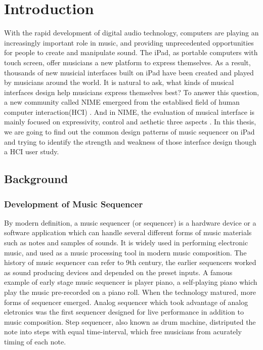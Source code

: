\pagestyle{fancy}
\rhead{\thepage}
\chapter{Introduction}

With the rapid development of digital audio technology, computers are playing an increasingly important role in music, and providing unprecedented opportunities for people to create and manipulate sound. The iPad, as portable computers with touch screen, offer musicians a new platform to express themselves. As a result, thousands of new musicial interfaces built on iPad have been created and played by musicians around the world. It is natural to ask, what kinds of musical interfaces design help musicians express themselves best? To answer this question, a new community called NIME emergeed from the establised field of human computer interaction(HCI) \citep{Reference16}. And in NIME, the evaluation of musical interface is mainly focused on expressivity, control and aethetic three aspects \citep{Reference0}. In this thesis, we are going to find out the common design patterns of music sequencer on iPad and trying to identify the strength and weakness of those interface design though a HCI user study.

\section{Background}
\label{sec: backgound}

\subsection{Development of Music Sequencer}
\label{subsec: history}
By modern definition, a music sequencer (or sequencer) is a hardware device or a software application which can handle several different forms of music materials such as notes and samples of sounds. It is widely used in performing electronic music, and used as a music processing tool in modern music composition. The history of music sequencer can refer to 9th century, the earlier sequencers worked as sound producing devices and depended on the preset inputs. A famous example of early stage music sequencer is player piano, a self-playing piano which play the music pre-recorded on a piano roll. When the technology matured, more forms of sequencer emerged. Analog sequencer which took advantage of analog eletronics was the first sequencer designed for live performance in addition to music composition. Step sequencer, also known as drum machine, distriputed the note into steps with equal time-interval, which free musicians from acurately timing of each note.

